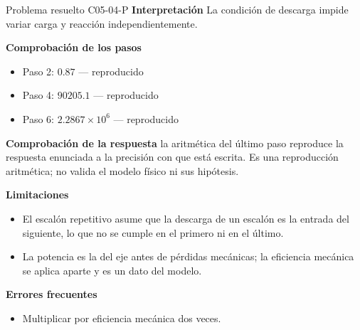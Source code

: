 \documentclass[10pt,openany]{book}
\begin{document}
\begin{studiumworked}{Problema resuelto C05-04-P}
\noindent\textbf{Interpretación}
La condición de descarga impide variar carga y reacción independientemente.

\noindent\textbf{Comprobación de los pasos}
\begin{itemize}
\item Paso 2: $0.87$ — reproducido
\item Paso 4: $90205.1$ — reproducido
\item Paso 6: $2.2867\times 10^{6}$ — reproducido
\end{itemize}

\noindent\textbf{Comprobación de la respuesta} la aritmética del último paso reproduce la respuesta enunciada a la precisión con que está escrita. Es una reproducción aritmética; no valida el modelo físico ni sus hipótesis.

\noindent\textbf{Limitaciones}
\begin{itemize}
\item El escalón repetitivo asume que la descarga de un escalón es la entrada del siguiente, lo que no se cumple en el primero ni en el último.
\item La potencia es la del eje antes de pérdidas mecánicas; la eficiencia mecánica se aplica aparte y es un dato del modelo.
\end{itemize}

\noindent\textbf{Errores frecuentes}
\begin{itemize}
\item Multiplicar por eficiencia mecánica dos veces.
\end{itemize}
\end{studiumworked}
\end{document}
